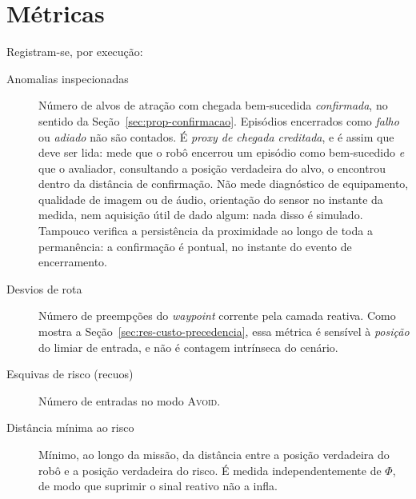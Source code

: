 \section{Métricas}
\label{sec:setup-metricas}

Registram-se, por execução:

\begin{description}
    \item[Anomalias inspecionadas] Número de alvos de atração com chegada
    bem-sucedida \emph{confirmada}, no sentido da Seção~\ref{sec:prop-confirmacao}.
    Episódios encerrados como \emph{falho} ou \emph{adiado} não são contados. É
    \emph{proxy de chegada creditada}, e é assim que deve ser lida: mede que o robô
    encerrou um episódio como bem-sucedido \emph{e} que o avaliador, consultando a
    posição verdadeira do alvo, o encontrou dentro da distância de confirmação. Não
    mede diagnóstico de equipamento, qualidade de imagem ou de áudio, orientação do
    sensor no instante da medida, nem aquisição útil de dado algum: nada disso é
    simulado. Tampouco verifica a persistência da proximidade ao longo de toda a
    permanência: a confirmação é pontual, no instante do evento de encerramento.

    \item[Desvios de rota] Número de preempções do \textit{waypoint} corrente pela
    camada reativa. Como mostra a Seção~\ref{sec:res-custo-precedencia}, essa métrica
    é sensível à \emph{posição} do limiar de entrada, e não é contagem intrínseca do
    cenário.

    \item[Esquivas de risco (recuos)] Número de entradas no modo \textsc{Avoid}.

    \item[Distância mínima ao risco] Mínimo, ao longo da missão, da distância entre a
    posição verdadeira do robô e a posição verdadeira do risco. É medida
    independentemente de $\Phi$, de modo que suprimir o sinal reativo não a infla.


\end{description}
